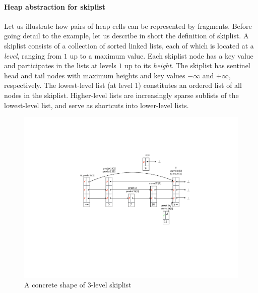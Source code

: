 \paragraph{Heap abstraction for skiplist}
Let us illustrate how pairs of heap cells can be represented by fragments. Before going detail to the example, let us describe in short the definition of skiplist. A skiplist consists of a collection of sorted linked lists, each of which is located at a {\em level}, ranging from $1$ up to a maximum value. Each skiplist node has a key value and participates in the lists at levels $1$ up to its {\em height}.
The skiplist has sentinel head and tail nodes with maximum heights and key values $-\infty$ and $+\infty$, respectively.
The lowest-level list (at level $1$) constitutes an ordered list of all nodes
in the skiplist. Higher-level lists are increasingly sparse sublists of the
lowest-level list, and serve as shortcuts into lower-level lists.
\begin{figure}
\center  
 \includegraphics[width=1.2\textwidth, trim={7cm 8cm 0.5cm 6cm}, clip]{skipshape.pdf}  
 \caption{A concrete shape of 3-level skiplist}
\label{sl-shape}
\end{figure}

